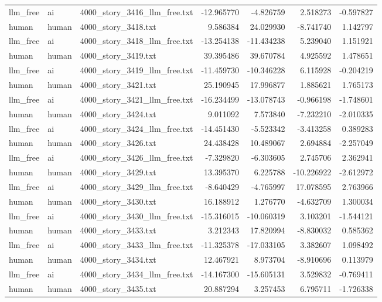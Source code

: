 \begin{longtable}{lllrrrr}
llm\_free & ai & 4000\_story\_3416\_llm\_free.txt & -12.965770 & -4.826759 & 2.518273 & -0.597827 \\
human & human & 4000\_story\_3418.txt & 9.586384 & 24.029930 & -8.741740 & 1.142797 \\
llm\_free & ai & 4000\_story\_3418\_llm\_free.txt & -13.254138 & -11.434238 & 5.239040 & 1.151921 \\
human & human & 4000\_story\_3419.txt & 39.395486 & 39.670784 & 4.925592 & 1.478651 \\
llm\_free & ai & 4000\_story\_3419\_llm\_free.txt & -11.459730 & -10.346228 & 6.115928 & -0.204219 \\
human & human & 4000\_story\_3421.txt & 25.190945 & 17.996877 & 1.885621 & 1.765173 \\
llm\_free & ai & 4000\_story\_3421\_llm\_free.txt & -16.234499 & -13.078743 & -0.966198 & -1.748601 \\
human & human & 4000\_story\_3424.txt & 9.011092 & 7.573840 & -7.232210 & -2.010335 \\
llm\_free & ai & 4000\_story\_3424\_llm\_free.txt & -14.451430 & -5.523342 & -3.413258 & 0.389283 \\
human & human & 4000\_story\_3426.txt & 24.438428 & 10.489067 & 2.694884 & -2.257049 \\
llm\_free & ai & 4000\_story\_3426\_llm\_free.txt & -7.329820 & -6.303605 & 2.745706 & 2.362941 \\
human & human & 4000\_story\_3429.txt & 13.395370 & 6.225788 & -10.226922 & -2.612972 \\
llm\_free & ai & 4000\_story\_3429\_llm\_free.txt & -8.640429 & -4.765997 & 17.078595 & 2.763966 \\
human & human & 4000\_story\_3430.txt & 16.188912 & 1.276770 & -4.632709 & 1.300034 \\
llm\_free & ai & 4000\_story\_3430\_llm\_free.txt & -15.316015 & -10.060319 & 3.103201 & -1.544121 \\
human & human & 4000\_story\_3433.txt & 3.212343 & 17.820994 & -8.830032 & 0.585362 \\
llm\_free & ai & 4000\_story\_3433\_llm\_free.txt & -11.325378 & -17.033105 & 3.382607 & 1.098492 \\
human & human & 4000\_story\_3434.txt & 12.467921 & 8.973704 & -8.910696 & 0.113979 \\
llm\_free & ai & 4000\_story\_3434\_llm\_free.txt & -14.167300 & -15.605131 & 3.529832 & -0.769411 \\
human & human & 4000\_story\_3435.txt & 20.887294 & 3.257453 & 6.795711 & -1.726338 \\

\end{longtable}

